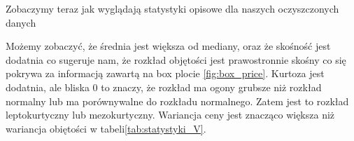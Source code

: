 \documentclass[12pt]{article}
\theoremstyle{exer}
\begin{document}
		Zobaczymy teraz jak wyglądają statystyki opisowe dla naszych oczyszczonych danych
	
	\begin{table}[H]
		\caption{Podstawowe statystyki opisowe dla objętości.}
		\label{tab:statystyki_price}
	\end{table}
	Możemy zobaczyć, że średnia jest większa od mediany, oraz że skośność jest dodatnia co sugeruje nam, że rozkład objętości jest prawostronnie skośny co się pokrywa za informacją zawartą na box plocie \ref{fig:box_price}. Kurtoza jest dodatnia, ale bliska $0$ to znaczy, że rozkład ma ogony grubsze niż rozkład normalny lub ma porównywalne do rozkładu normalnego. Zatem jest to rozkład leptokurtyczny lub mezokurtyczny. Wariancja ceny jest znacząco większa niż wariancja obiętości w tabeli\ref{tab:statystyki_V}.  
	
\end{document}
